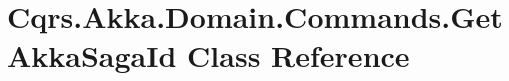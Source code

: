 \hypertarget{classCqrs_1_1Akka_1_1Domain_1_1Commands_1_1GetAkkaSagaId}{}\section{Cqrs.\+Akka.\+Domain.\+Commands.\+Get\+Akka\+Saga\+Id Class Reference}
\label{classCqrs_1_1Akka_1_1Domain_1_1Commands_1_1GetAkkaSagaId}
